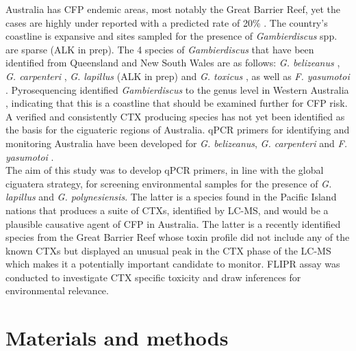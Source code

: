 \documentclass[12pt]{article}
\begin{document}
Australia has CFP endemic areas, most notably the Great Barrier Reef, yet the cases are highly under reported with a predicted rate of 20\% \citep{lewis2006ciguatera}. The country's coastline is expansive and sites sampled for the presence of \emph{Gambierdiscus} spp. are sparse (ALK in prep). The 4 species of \emph{Gambierdiscus} that have been identified from Queensland and New South Wales are as follows: \emph{G. belizeanus} \citep{murray2014molecular}, \emph{G. carpenteri} \citep{kohli2014high}, \emph{G. lapillus} (ALK in prep) and \emph{G. toxicus} \citep{hallegraeff2010algae}, as well as \emph{F. yasumotoi} \citep{murray2014molecular}. Pyrosequencing identified \emph{Gambierdiscus} to the genus level in Western Australia \citep{kohli2014cob} , indicating that this is a coastline that should be examined further for CFP risk. A verified and consistently CTX producing species has not yet been identified as the basis for the ciguateric regions of Australia.
qPCR primers for identifying and monitoring Australia have been developed for \emph{G. belizeanus}, \emph{G. carpenteri} and \emph{F. yasumotoi} \citep{nishimura2016quantitative,vandersea2012development}. \\

The aim of this study was to develop qPCR primers, in line with the global ciguatera strategy, for screening environmental samples for the presence of \emph{G. lapillus} and \emph{G. polynesiensis}. The latter is a species found in the Pacific Island nations that produces a suite of CTXs, identified by LC-MS, and would be a plausible causative agent of CFP in Australia. The latter is a recently identified species from the Great Barrier Reef whose toxin profile did not include any of the known CTXs but displayed an unusual peak in the CTX phase of the LC-MS which makes it a potentially important candidate to monitor. FLIPR assay was conducted to investigate CTX specific toxicity and draw inferences for environmental relevance.
\newpage
\section{Materials and methods}
\end{document}
